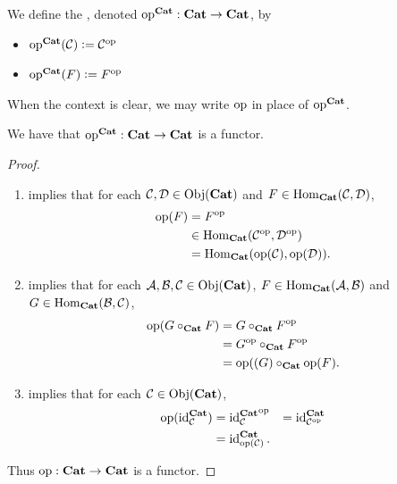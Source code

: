 \documentclass{book}
\begin{document}
	\begin{defn} 
		We define the , denoted $\opp^{\bCat}: \bCat \rightarrow \bCat$, by 
		\begin{itemize}
			\item $\opp^{\bCat}(\MC) \defeq \op{\MC}$
			\item $\opp^{\bCat}(F) \defeq \op{F}$
		\end{itemize}
	\end{defn}
	
	\begin{note}
		When the context is clear, we may write $\opp$ in place of $\opp^{\bCat}$.
	\end{note}
	
	\begin{ex} 
		We have that $\opp^{\bCat}: \bCat \rightarrow \bCat$ is a functor.
	\end{ex}
	
	\begin{proof}\
		\begin{enumerate}
			\item {} implies that for each $\MC, \MD \in \Obj(\bCat)$ and $F \in \Hom_{\bCat}(\MC, \MD)$,
			\begin{align*}
				\opp(F)
				& = \op{F} \\
				& \in \Hom_{\bCat}(\op{\MC}, \op{\MD}) \\
				& = \Hom_{\bCat}(\opp(\MC), \opp(\MD)).
			\end{align*}
			\item {} implies that for each $\MA, \MB, \MC \in \Obj(\bCat)$, $F \in \Hom_{\bCat}(\MA, \MB)$ and $G \in \Hom_{\bCat}(\MB, \MC)$, 
			\begin{align*}
				\opp(G \circ_{\bCat} F)
				& = \op{G \circ_{\bCat} F} \\
				& = \op{G} \circ_{\bCat} \op{F} \\
				& = \opp((G) \circ_{\bCat} \opp(F).
			\end{align*}
			\item {} implies that for each $\MC \in \Obj(\bCat)$, 
			\begin{align*}
				\opp(\id_{\MC}^{\bCat})
				& = \op{\id_{\MC}^{\bCat}} 
				& = \id_{\op{\MC}}^{\bCat} \\
				& = \id_{\opp(\MC)}^{\bCat}.
			\end{align*}
		\end{enumerate}
		Thus $\opp: \bCat \rightarrow \bCat$ is a functor.
	\end{proof}
	
\end{document}
